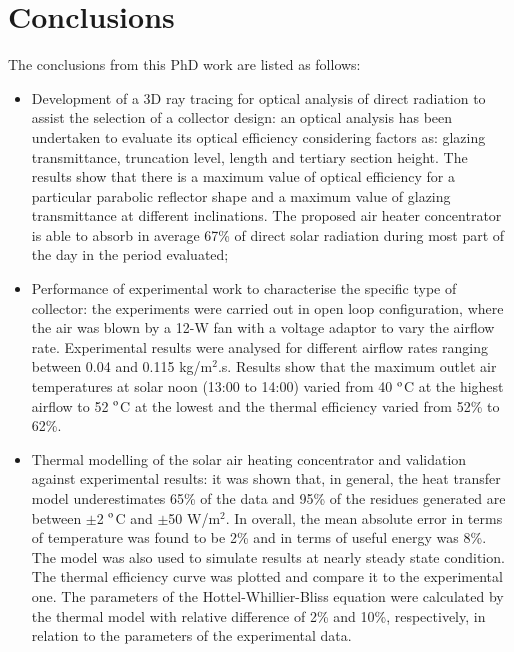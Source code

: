 \chapter{Conclusions}
\label{Cap:Con}
%

The conclusions from this PhD work are listed as follows:

\begin{itemize}
	\item Development of a 3D ray tracing for optical analysis of direct radiation to assist the selection of a collector design: an optical analysis has been undertaken to evaluate its optical efficiency considering factors as: glazing transmittance, truncation level, length and tertiary section height. The results show that there is a maximum value of optical efficiency for a particular parabolic reflector shape and a maximum value of glazing transmittance at different inclinations. The proposed air heater concentrator is able to absorb in average 67\% of direct solar radiation during most part of the day in the period evaluated;
	
	\item Performance of experimental work to characterise the specific type of collector:
	the experiments were carried out in open loop configuration, where the air was blown by a 12-W fan with a voltage adaptor to vary the airflow rate. Experimental results were analysed for different airflow rates ranging between 0.04 and 0.115 kg/m$^2$.s. Results show that the maximum outlet air temperatures at solar noon (13:00 to 14:00) varied from 40 $^{\rm{o}}$C at the highest airflow to 52 $^{\rm{o}}$C at the lowest and the thermal efficiency varied from 52\% to 62\%. 
	
	\item Thermal modelling of the solar air heating concentrator and validation against experimental results: it was shown that, in general, the heat transfer model underestimates 65\% of the data and 95\% of the residues generated are between $\pm$2 $^{\rm{o}}$C and $\pm$50 W/m$^2$. In overall, the mean absolute error in terms of temperature was found to be 2\% and in terms of useful energy was 8\%. The model was also used to simulate results at nearly steady state condition. The thermal efficiency curve was plotted and compare it to the experimental one. The parameters of the Hottel-Whillier-Bliss equation were calculated by the thermal model with relative difference of 2\% and 10\%, respectively, in relation to the parameters of the experimental data.
	

\end{itemize}
